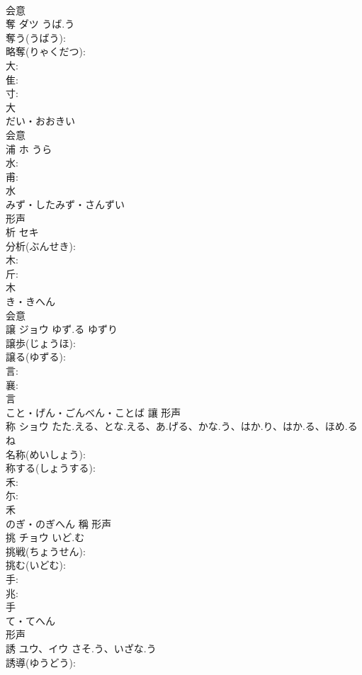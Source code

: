\documentclass[8pt]{extreport}
\begin{document}
\begin{CJK}{UTF8}{min}
\\	会意 
\\	奪	ダツ	うば.う		
\\	奪う(うばう): 
\\	略奪(りゃくだつ): 
\\	大: 
\\	隹: 
\\	寸: 
\\	大	
\\	だい・おおきい	
\\	会意 
\\	浦	ホ	うら		
\\	水: 
\\	甫: 
\\	水	
\\	みず・したみず・さんずい	
\\	形声 
\\	析	セキ			
\\	分析(ぶんせき): 
\\	木: 
\\	斤: 
\\	木	
\\	き・きへん	
\\	会意 
\\	譲	ジョウ	ゆず.る	ゆずり	
\\	譲歩(じょうほ): 
\\	譲る(ゆずる): 
\\	言: 
\\	襄: 
\\	言	
\\	こと・げん・ごんべん・ことば	讓	形声 
\\	称	ショウ	たた.える、とな.える、あ.げる、かな.う、はか.り、はか.る、ほめ.る	ね	
\\	名称(めいしょう): 
\\	称する(しょうする): 
\\	禾: 
\\	尓: 
\\	禾	
\\	のぎ・のぎへん	稱	形声 
\\	挑	チョウ	いど.む		
\\	挑戦(ちょうせん): 
\\	挑む(いどむ): 
\\	手: 
\\	兆: 
\\	手	
\\	て・てへん	
\\	形声 
\\	誘	ユウ、イウ	さそ.う、いざな.う		
\\	誘導(ゆうどう): 

\end{CJK}
\end{document}
